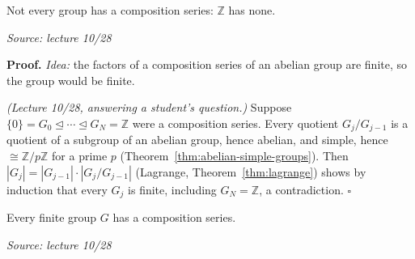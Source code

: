 \documentclass[11pt]{report}
\renewenvironment{proof}[1][Proof]{\noindent\textbf{#1.} }{\hfill$\square$\par\vspace{5pt}}
\newcommand{\srcline}[1]{\par\hfill{\footnotesize\textit{Source: #1}}}
\begin{document}
\begin{propbox}\label{prop:z-no-composition-series}
Not every group has a composition series: $\mathbb{Z}$ has none.
\srcline{lecture 10/28}
\end{propbox}

\begin{proof}
\textit{Idea:} the factors of a composition series of an abelian group are finite, so the group would be finite.\par
\textit{(Lecture 10/28, answering a student's question.)} Suppose $\{0\} = G_0 \trianglelefteq \cdots \trianglelefteq G_N = \mathbb{Z}$ were a composition series. Every quotient $G_j/G_{j-1}$ is a quotient of a subgroup of an abelian group, hence abelian, and simple, hence $\cong \mathbb{Z}/p\mathbb{Z}$ for a prime $p$ (Theorem~\ref{thm:abelian-simple-groups}). Then $|G_j| = |G_{j-1}| \cdot |G_j/G_{j-1}|$ (Lagrange, Theorem~\ref{thm:lagrange}) shows by induction that every $G_j$ is finite, including $G_N = \mathbb{Z}$, a contradiction.
\end{proof}

\begin{lembox}\label{lem:finite-composition-series}
Every finite group $G$ has a composition series.
\srcline{lecture 10/28}
\end{lembox}
\end{document}
